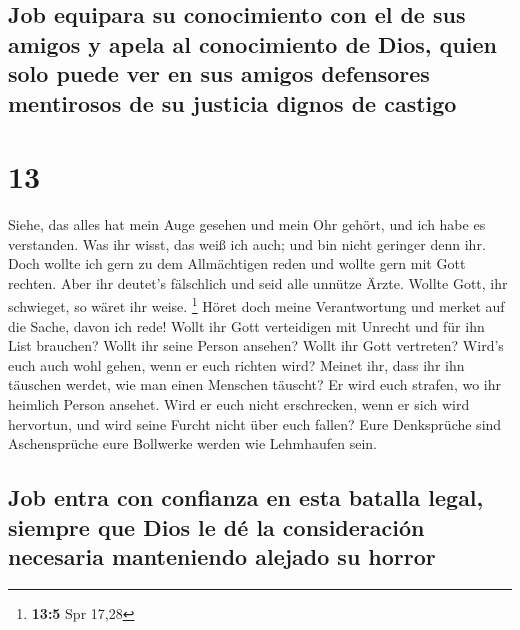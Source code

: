 \hypertarget{job-equipara-su-conocimiento-con-el-de-sus-amigos-y-apela-al-conocimiento-de-dios-quien-solo-puede-ver-en-sus-amigos-defensores-mentirosos-de-su-justicia-dignos-de-castigo}{%
\subsection{Job equipara su conocimiento con el de sus amigos y apela al
conocimiento de Dios, quien solo puede ver en sus amigos defensores
mentirosos de su justicia dignos de
castigo}\label{job-equipara-su-conocimiento-con-el-de-sus-amigos-y-apela-al-conocimiento-de-dios-quien-solo-puede-ver-en-sus-amigos-defensores-mentirosos-de-su-justicia-dignos-de-castigo}}

\hypertarget{section-12}{%
\section{13}\label{section-12}}

 Siehe, das alles hat mein Auge gesehen und mein Ohr
gehört, und ich habe es verstanden.  Was ihr wisst, das
weiß ich auch; und bin nicht geringer denn ihr.  Doch
wollte ich gern zu dem Allmächtigen reden und wollte gern mit Gott
rechten.  Aber ihr deutet's fälschlich und seid alle
unnütze Ärzte.  Wollte Gott, ihr schwieget, so wäret ihr
weise. \footnote{\textbf{13:5} Spr 17,28}  Höret doch
meine Verantwortung und merket auf die Sache, davon ich rede!
 Wollt ihr Gott verteidigen mit Unrecht und für ihn List
brauchen?  Wollt ihr seine Person ansehen? Wollt ihr Gott
vertreten?  Wird's euch auch wohl gehen, wenn er euch
richten wird? Meinet ihr, dass ihr ihn täuschen werdet, wie man einen
Menschen täuscht?  Er wird euch strafen, wo ihr heimlich
Person ansehet.  Wird er euch nicht erschrecken, wenn er
sich wird hervortun, und wird seine Furcht nicht über euch fallen?
 Eure Denksprüche sind Aschensprüche eure Bollwerke
werden wie Lehmhaufen sein.

\hypertarget{job-entra-con-confianza-en-esta-batalla-legal-siempre-que-dios-le-duxe9-la-consideraciuxf3n-necesaria-manteniendo-alejado-su-horror}{%
\subsection{Job entra con confianza en esta batalla legal, siempre que
Dios le dé la consideración necesaria manteniendo alejado su
horror}\label{job-entra-con-confianza-en-esta-batalla-legal-siempre-que-dios-le-duxe9-la-consideraciuxf3n-necesaria-manteniendo-alejado-su-horror}}

